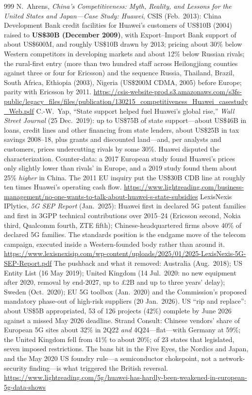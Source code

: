 \begin{thebibliography}{999}
 N.~Ahrens, \emph{China's Competitiveness: Myth, Reality, and Lessons for the United States and Japan---Case Study: Huawei}, CSIS (Feb.\ 2013): China Development Bank credit facilities for Huawei's customers of US\$10B (2004) raised to \textbf{US\$30B (December 2009)}, with Export--Import Bank support of about US\$600M, and roughly US\$10B drawn by 2013; pricing about 30\% below Western competitors in developing markets and about 12\% below Russian rivals; the rural-first entry (more than two hundred staff across Heilongjiang counties against three or four for Ericsson) and the sequence Russia, Thailand, Brazil, South Africa, Ethiopia (2003), Nigeria (US\$200M CDMA, 2005) before Europe; parity with Ericsson by 2011. \url{https://csis-website-prod.s3.amazonaws.com/s3fs-public/legacy_files/files/publication/130215_competitiveness_Huawei_casestudy_Web.pdf}
 C.-W.~Yap, ``State support helped fuel Huawei's global rise,'' \emph{Wall Street Journal} (25 Dec.\ 2019): up to US\$75B of state support---about US\$46B in loans, credit lines and other financing from state lenders, about US\$25B in tax savings 2008--18, plus grants and discounted land---and, per analysts and customers, prices undercutting rivals by some 30\%. Huawei disputed the characterization. Counter-data: a 2017 European study found Huawei's prices only slightly lower than rivals' in Europe, and a 2019 study found them about 25\% \emph{higher} in China. The 2011 EU inquiry put the US\$30B CDB line at roughly ten times Huawei's operating cash flow. \url{https://www.lightreading.com/business-management/no-one-wants-to-talk-about-huawei-s-state-subsidies}
 LexisNexis IPlytics, \emph{5G SEP Report} (Jan.\ 2025): Huawei first in declared 5G patent families and first in 3GPP technical contributions over 2015--24 (Ericsson second, Nokia third, Qualcomm fourth, ZTE fifth); Chinese-headquartered firms above 40\% of declared 5G families. The standards position is the endgame move of the telecom campaign, executed inside a Western-founded body rather than around it. \url{https://www.lexisnexisip.com/wp-content/uploads/2025/01/2025-LexisNexis-5G-SEP-Report.pdf}
 The pushback and what it removed: Australia (Aug.\ 2018); US Entity List (16 May 2019); United Kingdom (14 Jul.\ 2020: no new equipment after 2020, removal by end-2027, up to \pounds2B and up to three years' delay); Sweden (Oct.\ 2020); EU 5G toolbox (Jan.\ 2020) and the Commission's proposed mandatory phase-out of high-risk suppliers (20 Jan.\ 2026). US ``rip and replace'': about US\$5B appropriated, 53 of 126 projects (42\%) complete by June 2026 against a missed May 2026 deadline. Strand Consult: Chinese vendors' share of European 5G sites about 32\% in 2Q22 \emph{and} 4Q24---flat---with Germany at 59\%; the United Kingdom fell from 41\% to about 20\%; of 23 states that legislated, seven imposed restrictions. The bans bit in the Five Eyes, the Nordics and Japan, and the May 2020 US foundry rule---a semiconductor chokepoint, not a network-security finding---is what triggered the British reversal. \url{https://www.lightreading.com/5g/huawei-has-hardly-been-weakened-in-european-5g-data-shows}

\end{thebibliography}
